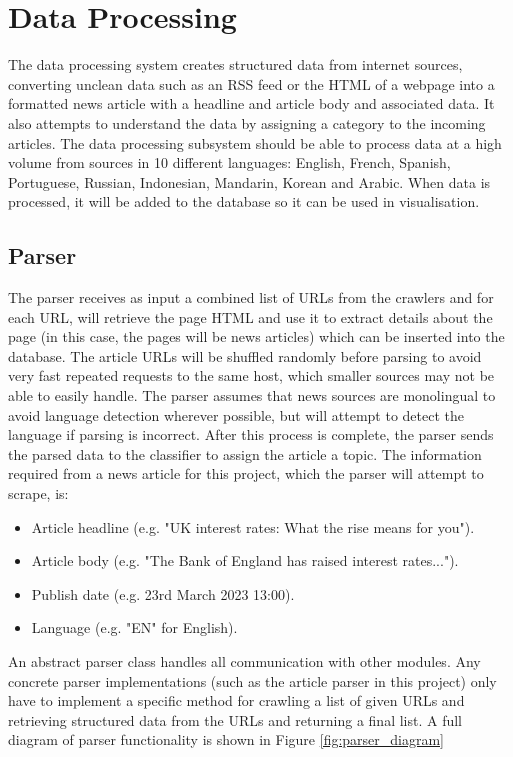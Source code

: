 \documentclass{l4proj}
\begin{document}
\section{Data Processing}
The data processing system creates structured data from internet sources, converting unclean data such as an RSS feed or the HTML of a webpage into a formatted news article with a headline and article body and associated data. It also attempts to understand the data by assigning a category to the incoming articles. The data processing subsystem should be able to process data at a high volume from sources in 10 different languages: English, French, Spanish, Portuguese, Russian, Indonesian, Mandarin, Korean and Arabic. When data is processed, it will be added to the database so it can be used in visualisation.

\subsection{Parser}
The parser receives as input a combined list of URLs from the crawlers and for each URL, will retrieve the page HTML and use it to extract details about the page (in this case, the pages will be news articles) which can be inserted into the database. The article URLs will be shuffled randomly before parsing to avoid very fast repeated requests to the same host, which smaller sources may not be able to easily handle. The parser assumes that news sources are monolingual to avoid language detection wherever possible, but will attempt to detect the language if parsing is incorrect. After this process is complete, the parser sends the parsed data to the classifier to assign the article a topic. The information required from a news article for this project, which the parser will attempt to scrape, is:
\begin{itemize}
    \item Article headline (e.g. "UK interest rates: What the rise means for you").
    \item Article body (e.g. "The Bank of England has raised interest rates...").
    \item Publish date (e.g. 23rd March 2023 13:00).
    \item Language (e.g. "EN" for English).
\end{itemize}
 An abstract parser class handles all communication with other modules. Any concrete parser implementations (such as the article parser in this project) only have to implement a specific method for crawling a list of given URLs and retrieving structured data from the URLs and returning a final list. A full diagram of parser functionality is shown in Figure \ref{fig:parser_diagram}
\end{document}
